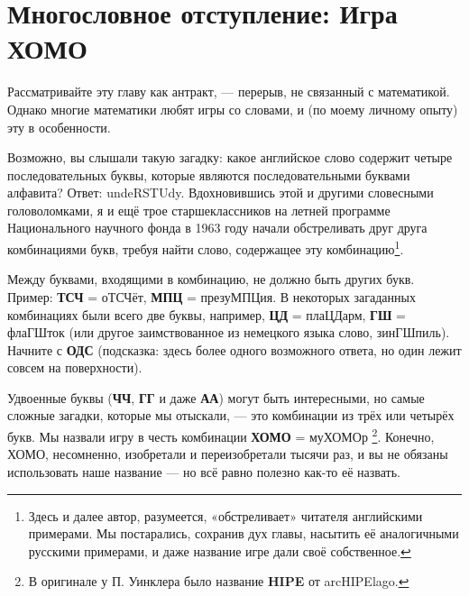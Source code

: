 \chapter{Многословное отступление: Игра ХОМО}




Рассматривайте эту главу как антракт, --- перерыв, не связанный с математикой. Однако многие математики любят игры со словами, и (по моему личному опыту) эту в особенности. 

Возможно, вы слышали такую загадку: какое английское слово содержит четыре последовательных буквы, которые являются последовательными буквами алфавита?
Ответ: undeRSTUdy.
Вдохновившись этой и другими словесными головоломками, я и ещё трое старшеклассников на летней программе Национального научного фонда в 1963 году начали обстреливать друг друга комбинациями букв, требуя найти слово, содержащее эту комбинацию\footnote{Здесь и далее автор, разумеется, «обстреливает» читателя английскими примерами. Мы постарались, сохранив дух главы, насытить её аналогичными русскими примерами, и даже название игре дали своё собственное. \pr}.

Между буквами, входящими в комбинацию, не должно быть других букв.
Пример:
\textbf{ТСЧ} = оТСЧёт,
\textbf{МПЦ} = презуМПЦия.
В некоторых загаданных комбинациях были всего две буквы, например, 
\textbf{ЦД} = плаЦДарм, 
\textbf{ГШ} = флаГШток (или другое заимствованное из немецкого языка слово, зинГШпиль).
Начните с \textbf{ОДС} (подсказка: здесь более одного возможного ответа, но один лежит совсем на поверхности). 

Удвоенные буквы 
(\textbf{ЧЧ}, \textbf{ГГ} и даже \textbf{АА}) могут быть интересными, но самые сложные загадки, которые мы отыскали, --- это комбинации из трёх или четырёх букв.
Мы назвали игру в честь комбинации \textbf{ХОМО} = муХОМОр%
\footnote{В оригинале у П. Уинклера было название \textbf{HIPE} от arcHIPElago.}.
Конечно, ХОМО, несомненно, изобретали и переизобретали тысячи раз, и вы не обязаны использовать наше название --- но всё равно полезно как-то её назвать. 


